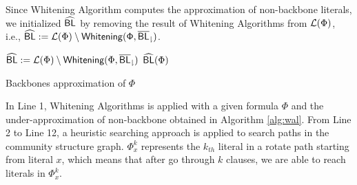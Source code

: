   Since Whitening Algorithm computes the approximation of non-backbone literals, we initialized ${\sf \widehat{BL}}$ by removing the result of Whitening Algorithms from ${\cal L}(\Phi)$, i.e., ${\sf \widehat{BL}}:={\cal L}(\Phi)\setminus{\sf Whitening(\Phi,{\sf \overline{BL}_\downharpoonright})}$.

\begin{algorithm}
\SetAlgoShortEnd
\SetFillComment
{}


${\sf \widehat{BL}}:={\cal L}(\Phi)\setminus{\textsf{Whitening}}(\Phi,{\sf \overline{BL}_\downharpoonright})$\;
\Return ${\sf \widehat{BL}}(\Phi)$\;
\caption{Backbones approximation of $\Phi$}
\label{alg:nBLo}
\end{algorithm}

 In Line 1, Whitening Algorithms is applied with a given formula $\Phi$ and the under-approximation of non-backbone obtained in Algorithm \ref{alg:wal}. From Line 2 to Line 12, a heuristic searching approach is applied to search paths in the community structure graph. $\Phi^k_x$ represents the $k_{th}$ literal in a rotate path starting from literal $x$, which means that after go through $k$ clauses, we are able to reach literals in $\Phi^k_x$.



